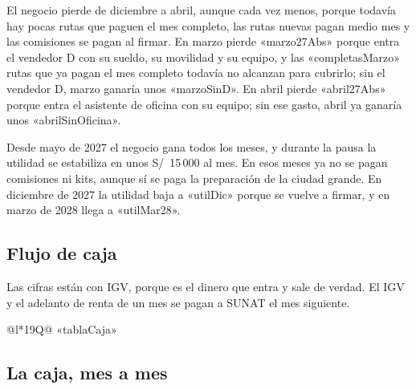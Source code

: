 \documentclass[10.5pt,a4paper]{article}
\begin{document}
El negocio pierde de diciembre a abril, aunque cada vez menos, porque todavía hay pocas rutas que paguen el mes completo, las rutas nuevas pagan medio mes y las comisiones se pagan al firmar. En marzo pierde «marzo27Abs» porque entra el vendedor D con su sueldo, su movilidad y su equipo, y las «completasMarzo» rutas que ya pagan el mes completo todavía no alcanzan para cubrirlo; sin el vendedor D, marzo ganaría unos «marzoSinD». En abril pierde «abril27Abs» porque entra el asistente de oficina con su equipo; sin ese gasto, abril ya ganaría unos «abrilSinOficina».

Desde mayo de 2027 el negocio gana todos los meses, y durante la pausa la utilidad se estabiliza en unos S/~15\,000 al mes. En esos meses ya no se pagan comisiones ni kits, aunque sí se paga la preparación de la ciudad grande. En diciembre de 2027 la utilidad baja a «utilDic» porque se vuelve a firmar, y en marzo de 2028 llega a «utilMar28».

\begin{landscape}
\section{Flujo de caja}
Las cifras están con IGV, porque es el dinero que entra y sale de verdad. El IGV y el adelanto de renta de un mes se pagan a SUNAT el mes siguiente.

{\scriptsize\setlength{\tabcolsep}{2.4pt}\renewcommand{\arraystretch}{1.1}
\begin{tabular}{@{}l*{19}{Q}@{}}
\toprule
«tablaCaja»
\bottomrule
\end{tabular}}
\end{landscape}

\subsection{La caja, mes a mes}
\end{document}
